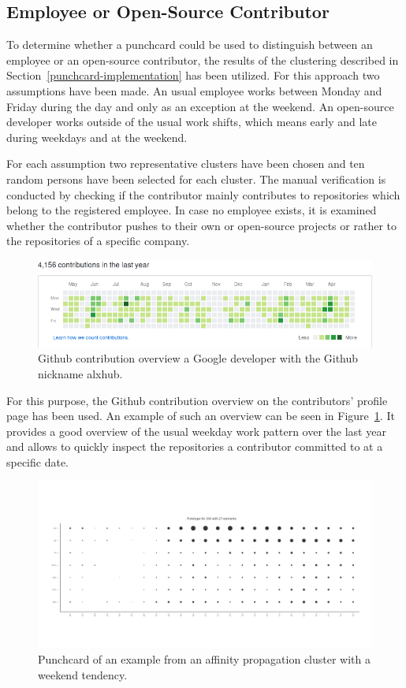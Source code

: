 \subsection{Employee or Open-Source Contributor}
To determine whether a punchcard could be used to distinguish between an employee or an open-source contributor, the results of the clustering described in Section~\ref{punchcard-implementation} has been utilized.
For this approach two assumptions have been made.
An usual employee works between Monday and Friday during the day and only as an exception at the weekend.
An open-source developer works outside of the usual work shifts, which means early and late during weekdays and at the weekend.

For each assumption two representative clusters have been chosen and ten random persons have been selected for each cluster.
The manual verification is conducted by checking if the contributor mainly contributes to repositories which belong to the registered employee.
In case no employee exists, it is examined whether the contributor pushes to their own or open-source projects or rather to the repositories of a specific company.

\begin{figure}[H]
    \includegraphics[scale=0.6]{./graphs/contribution-overview-alxhub}
    \centering
    \caption{Github contribution overview a Google developer with the Github nickname alxhub.}\label{fig:github-contribution-overview}
\end{figure}

For this purpose, the Github contribution overview on the contributors' profile page has been used.
An example of such an overview can be seen in Figure~\ref{fig:github-contribution-overview}.
It provides a good overview of the usual weekday work pattern over the last year and allows to quickly inspect the repositories a contributor committed to at a specific date.

\begin{figure}[H]
    \includegraphics[scale=0.32]{./graphs/analysis-affinity/204}
    \centering
    \caption{Punchcard of an example from an affinity propagation cluster with a weekend tendency.}\label{fig:random-sleep-rhythm}
\end{figure}

